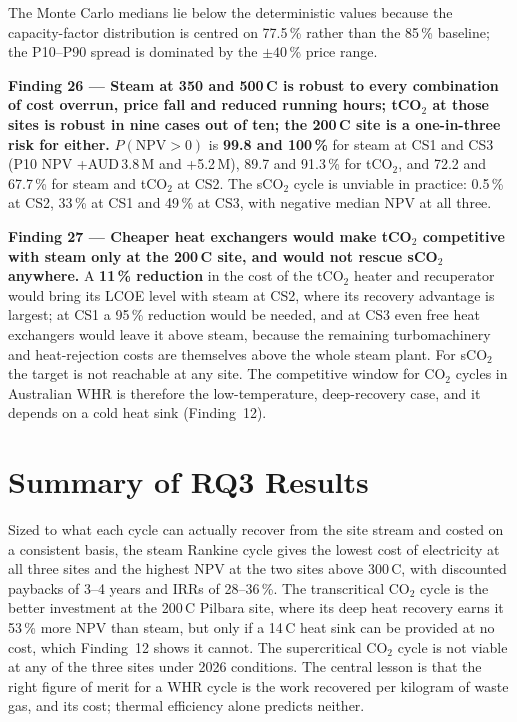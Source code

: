 \documentclass[12pt,a4paper]{report}
\newcommand{\keyresult}[1]{\textbf{\color{resultgreen}#1}}
\begin{document}
The Monte Carlo medians lie below the deterministic values because the
capacity-factor distribution is centred on 77.5\,\% rather than the 85\,\%
baseline; the P10--P90 spread is dominated by the $\pm 40$\,\% price range.

\begin{findingbox}
\textbf{Finding 26 --- Steam at 350 and 500\,\textdegree C is robust to every
combination of cost overrun, price fall and reduced running hours; tCO$_2$
at those sites is robust in nine cases out of ten; the 200\,\textdegree C
site is a one-in-three risk for either.}
$P(\mathrm{NPV}>0)$ is \keyresult{99.8 and 100\,\%} for steam at CS1 and CS3
(P10 NPV +AUD\,3.8\,M and +5.2\,M), 89.7 and 91.3\,\% for tCO$_2$, and 72.2
and 67.7\,\% for steam and tCO$_2$ at CS2. The sCO$_2$ cycle is unviable in
practice: 0.5\,\% at CS2, 33\,\% at CS1 and 49\,\% at CS3, with negative
median NPV at all three.
\end{findingbox}

\begin{findingbox}
\textbf{Finding 27 --- Cheaper heat exchangers would make tCO$_2$ competitive
with steam only at the 200\,\textdegree C site, and would not rescue sCO$_2$
anywhere.}
A \keyresult{11\,\% reduction} in the cost of the tCO$_2$ heater and
recuperator would bring its LCOE level with steam at CS2, where its recovery
advantage is largest; at CS1 a 95\,\% reduction would be needed, and at CS3
even free heat exchangers would leave it above steam, because the remaining
turbomachinery and heat-rejection costs are themselves above the whole steam
plant. For sCO$_2$ the target is not reachable at any site. The competitive
window for CO$_2$ cycles in Australian WHR is therefore the low-temperature,
deep-recovery case, and it depends on a cold heat sink (Finding~12).
\end{findingbox}

\section{Summary of RQ3 Results}
\label{sec:rq3_summary}

Sized to what each cycle can actually recover from the site stream and
costed on a consistent basis, the steam Rankine cycle gives the lowest cost
of electricity at all three sites and the highest NPV at the two sites above
300\,\textdegree C, with discounted paybacks of 3--4 years and IRRs of
28--36\,\%. The transcritical CO$_2$ cycle is the better investment at the
200\,\textdegree C Pilbara site, where its deep heat recovery earns it 53\,\%
more NPV than steam, but only if a 14\,\textdegree C heat sink can be
provided at no cost, which Finding~12 shows it cannot. The supercritical
CO$_2$ cycle is not viable at any of the three sites under 2026 conditions.
The central lesson is that the right figure of merit for a WHR cycle is the
work recovered per kilogram of waste gas, and its cost; thermal efficiency
alone predicts neither.
\end{document}
